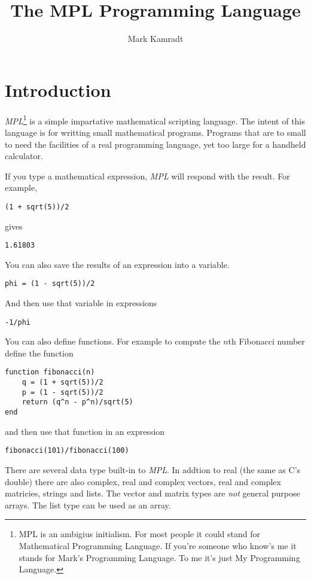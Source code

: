 \documentclass{article}
\begin{document}
\title{The MPL Programming Language}
\author{Mark Kamradt}
\maketitle
\section{Introduction}
\emph{MPL}\footnote{MPL is an ambigius initialism.
  For most people it could stand for Mathematical Programming Language.
  If you're someone who know's me it stands for Mark's Programming Language.
  To me it's just My Programming Language.}
is a simple impartative mathematical scripting language.
The intent of this language is for writting small mathematical programs.
Programs that are to small to need the facilities of a real programming
language, yet too large for a handheld calculator.

If you type a mathematical expression, \emph{MPL} will respond with
the result.  For example,
\begin{verbatim}
(1 + sqrt(5))/2
\end{verbatim}
gives
\begin{verbatim}
1.61803
\end{verbatim}

You can also save the results of an expression into a variable.
\begin{verbatim}
phi = (1 - sqrt(5))/2
\end{verbatim}
And then use that variable in expressions
\begin{verbatim}
-1/phi
\end{verbatim}

You can also define functions. For example to compute the $n$th Fibonacci
number define the function
\begin{verbatim}
function fibonacci(n)
    q = (1 + sqrt(5))/2
    p = (1 - sqrt(5))/2
    return (q^n - p^n)/sqrt(5)
end
\end{verbatim}
and then use that function in an expression
\begin{verbatim}
fibonacci(101)/fibonacci(100)
\end{verbatim}

There are several data type built-in to \emph{MPL}.
In addtion to real (the same as C's double) there are also
complex, real and complex vectors, real and complex matricies,
strings and lists.
The vector and matrix types are \emph{not} general purpose arrays.
The list type can be used as an array.
\end{document}
